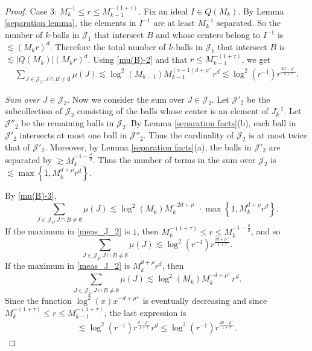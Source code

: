 \documentclass{amsart}
\numberwithin{equation}{section}
\theoremstyle{definition}
\theoremstyle{definition}
\newcommand{\cbr}[1]{ \left\{ {#1} \right\} }
\begin{document}
\begin{proof}
Case 3: $M_k^{-1} \leq r \leq M_{k-1}^{-(1+\tau)}$. Fix an ideal $I \in Q(M_k)$. By Lemma \ref{separation lemma}, the elements in $I^{-1}$ are at least $M_k^{-1}$ separated. 
So the number of $k$-balls in $\mathcal{J}_1$ that intersect $B$ and whose centers belong to $I^{-1}$ 
is $\lesssim (M_k r)^d$. 
Therefore the total number of $k$-balls in $\mathcal{J}_1$ that intersect $B$ is $\lesssim |Q(M_k)| (M_k r)^d$. 
Using  \eqref{mu(B)-2} and that $r \leq M_{k-1}^{-(1+\tau)}$, we get 
\begin{align*}
\sum_{J \in \mathcal{J}_1, J \cap B \neq \emptyset} \mu(J) \lesssim \log^2(M_{k-1}) 
M_{k-1}^{(\tau -1)d+\rho^-} 
r^d
 \lesssim \log^2 (r^{-1}) 
 r^{\frac{2d-\rho^-}{1+\tau}}. 
\end{align*}

\textit{Sum over $J \in \mathcal{J}_2.$} 
Now we consider the sum over $J \in \mathcal{J}_2$. 
Let $\mathcal{J}'_2$ be the subcollection of $\mathcal{J}_2$ consisting of the balls whose center is an element of $J_{k}^{-1}$. 
Let $\mathcal{J}''_2$ be the remaining balls in $\mathcal{J}_2$. 
By Lemma \ref{separation facts}(b), each ball in $\mathcal{J}'_2$ intersects at most one ball in $\mathcal{J}''_2$. 
Thus the cardinality of $\mathcal{J}_2$ is at most twice that of $\mathcal{J}'_2$. 
Moreover, by Lemma \ref{separation facts}(a), 
the balls in $\mathcal{J}'_2$ are separated by $\gtrsim M_k^{-1-\frac{\rho}{d}}$. 
Thus the number of terms in the sum over $\mathcal{J}_2$ is $ \lesssim \max\cbr{ 1, M_k^{d+\rho} r^d}$.




By \eqref{mu(B)-3}, 
\begin{equation}\label{meas_J_2}
\sum_{J \in \mathcal{J}_2, J \cap B \neq \emptyset} \mu(J) \lesssim \log^2(M_k)
M_k^{-2d+\rho^-}
\cdot 
\max\cbr{1, M_k^{d+\rho} r^d}.
\end{equation}
If the maximum 
in \eqref{meas_J_2} 
is $1$, then $M_k^{-(1+\tau)} \leq r \leq M_k^{-1-\frac{\rho}{d}}$, and so 
$$
\sum_{J \in \mathcal{J}_2, J \cap B \neq \emptyset} \mu(J) \lesssim \log^2(r^{-1}) 
r^{\frac{2d+\rho^-}{1+\tau}}.
$$
If the maximum 
in \eqref{meas_J_2} 
is $M_k^{d +\rho} r^d$, 
then 
$$
\sum_{J \in \mathcal{J}_2, J \cap B \neq \emptyset} \mu(J) 
\lesssim 
\log^2(M_k) 
M_k^{-d+\rho^+}
r^d. 
$$
Since the function  
$\log^2(x)x^{-d+\rho^+}$ 
is eventually decreasing and 
since $M_k^{-(1+\tau)} \leq r \leq M_{k-1}^{-(1+\tau)}$, 
the last expression is 
\begin{align*}
\lesssim 
\log^2(r^{-1}) 
r^{\frac{d-\rho^+}{1+\tau}} 
r^d 
\leq 
\log^2(r^{-1})  
r^{\frac{2d-\rho^-}{1+\tau}}. 
\end{align*}
\end{proof}
\end{document}
